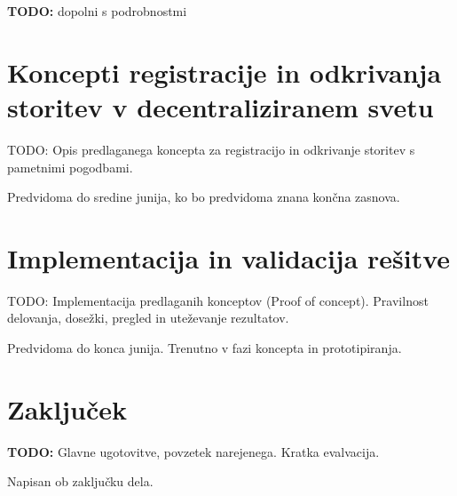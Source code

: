 \documentclass[a4paper, 12pt]{book}
\begin{document}
\textbf{TODO:} dopolni s podrobnostmi

\chapter{Koncepti registracije in odkrivanja storitev v decentraliziranem svetu}
\label{ch4}

TODO: Opis predlaganega koncepta za registracijo in odkrivanje storitev s pametnimi pogodbami.

Predvidoma do sredine junija, ko bo predvidoma znana končna zasnova.

\chapter{Implementacija in validacija rešitve}
\label{ch5}
TODO: Implementacija predlaganih konceptov (Proof of concept). Pravilnost delovanja, dosežki, pregled in uteževanje rezultatov.

Predvidoma do konca junija. Trenutno v fazi koncepta in prototipiranja.


\chapter{Zaključek}
\label{stroka}
\textbf{TODO:} Glavne ugotovitve, povzetek narejenega. Kratka evalvacija.

Napisan ob zaključku dela.


\newpage %
\ \\
\clearpage
{}


\end{document}
